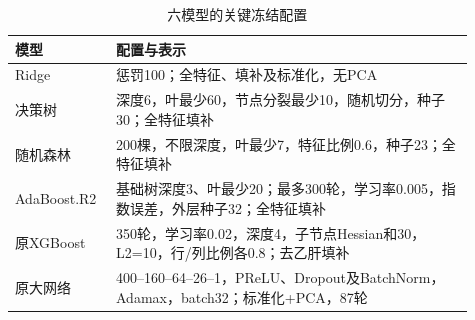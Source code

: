 \begin{table}[htbp]
\small
\setlength{\tabcolsep}{5pt}
\centering
\caption{六模型的关键冻结配置}
\label{tab:baseline-config}
\begin{tabular}{L{0.18\linewidth}L{0.73\linewidth}}
\toprule
模型 & 配置与表示 \\
\midrule
Ridge & 惩罚100；全特征、填补及标准化，无PCA \\
决策树 & 深度6，叶最少60，节点分裂最少10，随机切分，种子30；全特征填补 \\
随机森林 & 200棵，不限深度，叶最少7，特征比例0.6，种子23；全特征填补 \\
AdaBoost.R2 & 基础树深度3、叶最少20；最多300轮，学习率0.005，指数误差，外层种子32；全特征填补 \\
原XGBoost & 350轮，学习率0.02，深度4，子节点Hessian和30，L2=10，行/列比例各0.8；去乙肝填补 \\
原大网络 & 400--160--64--26--1，PReLU、Dropout及BatchNorm，Adamax，batch32；标准化+PCA，87轮 \\
\bottomrule
\end{tabular}
\end{table}
